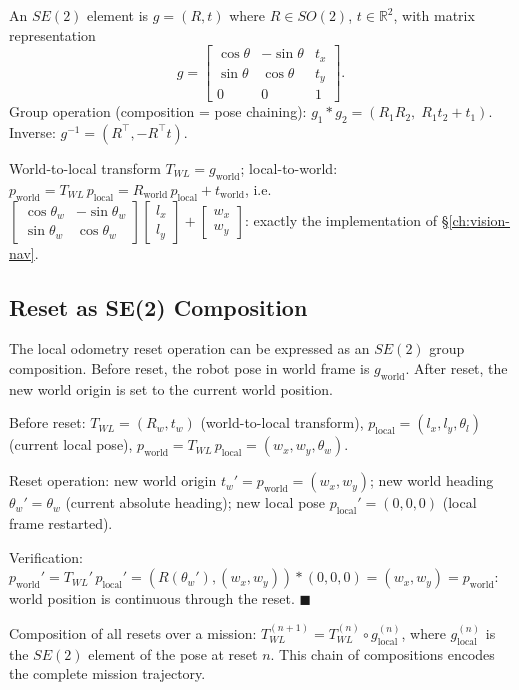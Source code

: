 \begin{eqblock}
An $SE(2)$ element is $g=(R,t)$ where $R\in SO(2)$, $t\in\mathbb{R}^2$, with matrix representation
$$
g = \begin{bmatrix} \cos\theta & -\sin\theta & t_x \\ \sin\theta & \cos\theta & t_y \\ 0 & 0 & 1 \end{bmatrix}.
$$
Group operation (composition = pose chaining): $g_1 * g_2 = (R_1 R_2,\; R_1 t_2 + t_1)$. Inverse: $g^{-1} = (R^\top, -R^\top t)$.

World-to-local transform $T_{WL} = g_{\text{world}}$; local-to-world: $p_{\text{world}} = T_{WL}\,p_{\text{local}} = R_{\text{world}}\,p_{\text{local}} + t_{\text{world}}$, i.e.\ $\begin{bmatrix}\cos\theta_w & -\sin\theta_w\\ \sin\theta_w & \cos\theta_w\end{bmatrix}\begin{bmatrix}l_x\\l_y\end{bmatrix} + \begin{bmatrix}w_x\\w_y\end{bmatrix}$: exactly the  implementation of \S\ref{ch:vision-nav}.
\end{eqblock}

\subsection{Reset as SE(2) Composition}

The local odometry reset operation can be expressed as an $SE(2)$ group composition. Before reset, the robot pose in world frame is $g_{\text{world}}$. After reset, the new world origin is set to the current world position.

\begin{eqblock}
Before reset: $T_{WL}=(R_w,t_w)$ (world-to-local transform), $p_{\text{local}}=(l_x,l_y,\theta_l)$ (current local pose), $p_{\text{world}} = T_{WL}\,p_{\text{local}} = (w_x,w_y,\theta_w)$.

Reset operation: new world origin $t_w' = p_{\text{world}} = (w_x,w_y)$; new world heading $\theta_w' = \theta_w$ (current absolute heading); new local pose $p_{\text{local}}' = (0,0,0)$ (local frame restarted).

Verification: $p_{\text{world}}' = T_{WL}'\,p_{\text{local}}' = (R(\theta_w'), (w_x,w_y)) * (0,0,0) = (w_x,w_y) = p_{\text{world}}$: world position is continuous through the reset. $\blacksquare$

Composition of all resets over a mission: $T_{WL}^{(n+1)} = T_{WL}^{(n)} \circ g_{\text{local}}^{(n)}$, where $g_{\text{local}}^{(n)}$ is the $SE(2)$ element of the pose at reset $n$. This chain of compositions encodes the complete mission trajectory.
\end{eqblock}
